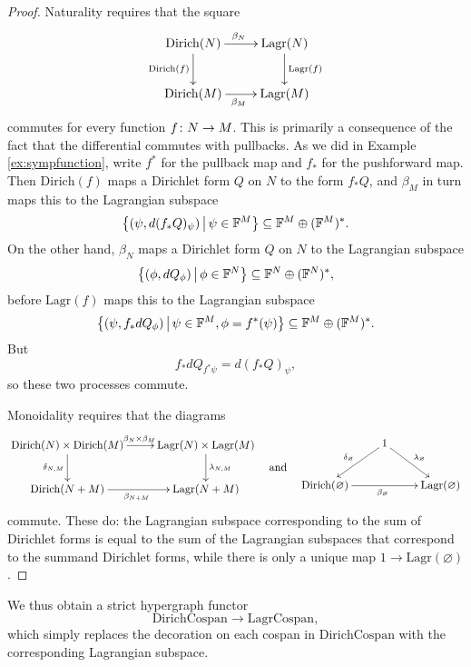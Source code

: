 \begin{proof}
Naturality requires that the square
\[
\xymatrix{
  \mathrm{Dirich}(N) \ar[r]^{\beta_N} \ar[d]_{\mathrm{Dirich}(f)} &
  \mathrm{Lagr}(N) \ar[d]^{\mathrm{Lagr}(f)}  \\
  \mathrm{Dirich}(M) \ar[r]_{\beta_M} & \mathrm{Lagr}(M)
}
\]
commutes for every function $f{\colon} N \to M$. This is primarily a consequence of the
fact that the differential commutes with pullbacks. As we did in Example
\ref{ex:sympfunction},
write $f^\ast$ for the pullback map and $f_\ast$ for the pushforward map.
Then $\mathrm{Dirich}(f)$ maps a Dirichlet form $Q$ on $N$ to the form $f_\ast Q$,
and $\beta_M$ in turn maps this to the Lagrangian subspace 
\[
  \big\{(\psi,d(f_\ast Q)_\psi) \, \big\vert \, \psi \in {\mathbb F}^M\big\} \subseteq
  {\mathbb F}^M \oplus ({\mathbb F}^M)^\ast.
\]
On the other hand, $\beta_N$ maps a Dirichlet form $Q$ on $N$ to the Lagrangian
subspace
\[
\big\{(\phi,dQ_\phi) \,\big\vert\, \phi \in {\mathbb F}^N\big\}\subseteq
  {\mathbb F}^N \oplus ({\mathbb F}^N)^\ast, 
\]
before $\mathrm{Lagr}(f)$ maps this to the Lagrangian subspace
\[
  \big\{(\psi, f_\ast dQ_\phi) \,\big\vert\, \psi \in {\mathbb F}^M, \phi =
  f^\ast(\psi)\big\} \subseteq {\mathbb F}^M\oplus ({\mathbb F}^M)^\ast.
\]
But 
\[
  f_\ast dQ_{f^\ast\psi} = d(f_\ast Q)_{\psi},
\]
so these two processes commute.

Monoidality requires that the diagrams 
\[
\begin{aligned}
\xymatrix{
  \mathrm{Dirich}(N) \times \mathrm{Dirich}(M) \ar[r]^(.52){\beta_N \times
  \beta_M} \ar[d]_{\delta_{N,M}} & \mathrm{Lagr}(N) \times \mathrm{Lagr}(M)
  \ar[d]^{\lambda_{N,M}}  \\
  \mathrm{Dirich}(N+M) \ar[r]_{\beta_{N+M}} & \mathrm{Lagr}(N+M)
}
\end{aligned}
\quad
\mbox{and}
\quad
\begin{aligned}
\xymatrix{
  & 1 \ar[dl]_{\delta_\varnothing} \ar[dr]^{\lambda_\varnothing}\\
\mathrm{Dirich}(\varnothing)  \ar[rr]_{\beta_\varnothing} &&
\mathrm{Lagr}(\varnothing)
}
\end{aligned}
\]
commute. These do: the Lagrangian subspace corresponding to the sum of Dirichlet
forms is equal to the sum of the Lagrangian subspaces that correspond to the
summand Dirichlet forms, while there is only a unique map $1 \to
\mathrm{Lagr}(\varnothing)$.
\end{proof}

We thus obtain a strict hypergraph functor 
\[   
\mathrm{DirichCospan} \to \mathrm{LagrCospan},
\]
which simply replaces the decoration on each cospan in $\mathrm{DirichCospan}$
with the corresponding Lagrangian subspace.



